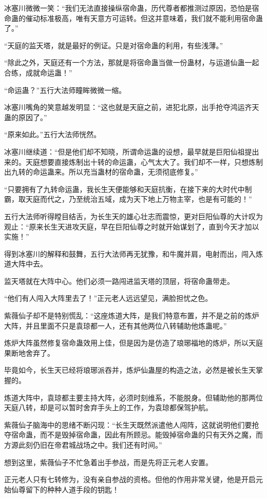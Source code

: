 \begin{this_body}
冰塞川微微一笑：“我们无法直接操纵宿命蛊，历代尊者都推测过原因，恐怕是宿命蛊的催动标准极高，唯有天意方可运转。但这并意味着，我们就不能利用宿命蛊了。”

“天庭的监天塔，就是最好的例证。只是对宿命蛊的利用，有些浅薄。”

“除此之外，天庭还有一个方法，那就是将宿命蛊当做一份蛊材，与运道仙蛊一起合练，成就命运蛊！”

“命运蛊？”五行大法师瞳眸微微一缩。

冰塞川嘴角的笑意越发明显：“这也就是天庭之前，进犯北原，出手抢夺鸿运齐天蛊的原因了。”

“原来如此。”五行大法师恍然。

冰塞川继续道：“但是他们却不知晓，所谓命运蛊的设想，最早就是巨阳仙祖提出来的。天庭想要直接炼制出十转的命运蛊，心气太大了。我们却不一样，只想炼制出九转的命运蛊来。所以充当蛊材的宿命蛊，无须彻底修复。”

“只要拥有了九转命运蛊，我长生天便能够和天庭抗衡，在接下来的大时代中制霸，取天庭而代之，乃至统治五域，成为天下地上万物主宰，也是有可能的！”

五行大法师听得瞠目结舌，为长生天的雄心壮志而震惊，更对巨阳仙尊的大计叹为观止：“原来长生天进攻天庭，早在巨阳仙尊之时就开始谋划了，直到今天才加以实施！”

得到冰塞川的解释和鼓舞，五行大法师再无犹豫，和牛魔并肩，电射而出，闯入炼道大阵中去。

监天塔就在大阵中心。他们必须一路闯进监天塔的顶层，将宿命蛊带走。

“他们有人闯入大阵里去了！”正元老人远远望见，满脸担忧之色。

紫薇仙子却不是特别慌乱：“这座炼道大阵，是我们特意布置，并不是之前的炼炉大阵，并且里面不只是袁琼都一人，还有其他两位八转辅助他炼蛊呢。”

炼炉大阵虽然修复宿命蛊效用上佳，但是因为是仿造了琅琊福地的炼炉，所以天庭果断地舍弃了。

毕竟如今，长生天已经将琅琊派吞并，炼炉仙蛊屋的构造之法，必然是被长生天掌握的。

炼道大阵中，袁琼都主要主持大阵，必须时刻维系，不能脱身。但辅助他的那两位天庭八转，却是可以暂时舍弃手头上的工作，为袁琼都保驾护航。

紫薇仙子脑海中的思绪不断闪现：“长生天既然派遣他人闯阵，这就说明他们要抢夺宿命蛊，而不是毁掉宿命蛊，因此有所顾忌。能毁掉宿命蛊的只有天外之魔，而方源此刻仍旧在帝君城战场之中。我们还有时间。”

想到这里，紫薇仙子不忙急着出手参战，而是先将正元老人安置。

正元老人只有七转修为，没有亲自参战的资格。但他的作用非常关键，他是开启元始仙尊留下的种种人道手段的钥匙！


\end{this_body}
